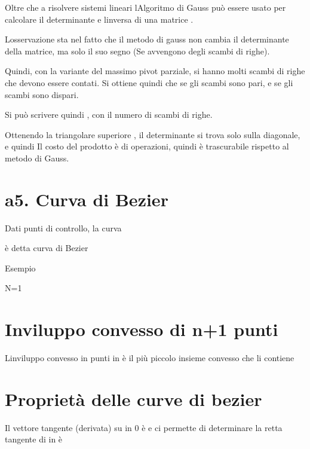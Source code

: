 \documentclass[
]{article}
\begin{document}
Oltre che a risolvere sistemi lineari l\textquotesingle Algoritmo di
Gauss può essere usato per calcolare il determinante e
l\textquotesingle inversa di una matrice .

L\textquotesingle osservazione sta nel fatto che il metodo di gauss non
cambia il determinante della matrice, ma solo il suo segno (Se avvengono
degli scambi di righe).

Quindi, con la variante del massimo pivot parziale, si hanno molti
scambi di righe che devono essere contati. Si ottiene quindi che {} se
gli scambi sono pari, e {} se gli scambi sono dispari.

Si può scrivere quindi {}, con {} il numero di scambi di righe.

Ottenendo la triangolare superiore {}, il determinante si trova solo
sulla diagonale, e quindi {}Il costo del prodotto è di {} operazioni,
quindi è trascurabile rispetto al metodo di Gauss.

\hypertarget{a5.-curva-di-bezier}{%
\section{a5. Curva di Bezier}\label{a5.-curva-di-bezier}}

Dati {} punti di controllo, la curva

{}

è detta curva di Bezier

Esempio

N=1

{}{}

{}

\hypertarget{inviluppo-convesso-di-n1-punti}{%
\section{Inviluppo convesso di n+1
punti}\label{inviluppo-convesso-di-n1-punti}}

L\textquotesingle inviluppo convesso in {} punti in {} è il più piccolo
insieme convesso che li contiene

\hypertarget{proprietuxe0-delle-curve-di-bezier}{%
\section{Proprietà delle curve di
bezier}\label{proprietuxe0-delle-curve-di-bezier}}

Il vettore tangente (derivata) su {} in 0 è {} e ci permette di
determinare la retta tangente di {} in {} è {}
\end{document}
